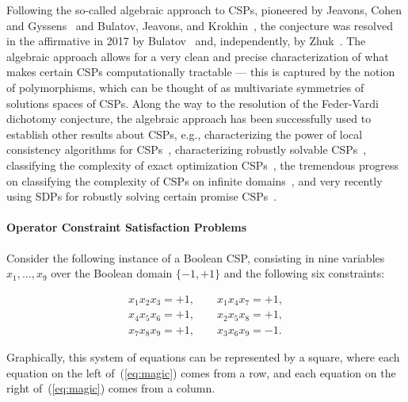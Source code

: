 \documentclass[11pt,letter]{article}
\begin{document}
Following the so-called algebraic approach to CSPs, pioneered by Jeavons, Cohen
and Gyssens~\cite{Jeavons97:closure} and Bulatov, Jeavons, and
Krokhin~\cite{Bulatov05:classifying}, the conjecture was resolved in the
affirmative in 2017 by Bulatov~\cite{Bulatov17:focs} and, independently,
by Zhuk~\cite{Zhuk17:focs,Zhuk20:jacm}. The algebraic approach allows for a very clean and
precise characterization of what makes certain CSPs computationally tractable
--- this is captured by the notion of polymorphisms, which can be thought of as
multivariate symmetries of solutions spaces of CSPs.
Along the way to the resolution of the Feder-Vardi dichotomy conjecture, the
algebraic approach has been successfully used to
establish other results about CSPs, 
e.g., characterizing the power of local consistency
algorithms for CSPs~\cite{Bulatov09:width,Barto14:local}, characterizing robustly solvable
CSPs~\cite{Guruswami12:tght,Dalmau13:toct,Barto16:sicomp}, classifying the
complexity of exact optimization CSPs~\cite{tz16:jacm,Kolmogorov17:sicomp}, the
tremendous progress on classifying the complexity of CSPs on infinite
domains~\cite{Bodirsky2021complexity}, and very recently using SDPs for robustly
solving certain promise CSPs~\cite{BGS23:stoc}.

\paragraph{Operator Constraint Satisfaction Problems}

Consider the following instance of a Boolean CSP, consisting in nine variables $x_1,\ldots,x_9$ over the Boolean domain $\{-1,+1\}$ and the following six
constraints:

\begin{equation}\label{eq:magic}
  \begin{split}
    x_1 x_2 x_3 = +1, \qquad x_1 x_4 x_7 = +1,\\
    x_4 x_5 x_6 = +1, \qquad x_2 x_5 x_8 = +1,\\
    x_7 x_8 x_9 = +1, \qquad x_3 x_6 x_9 = -1.
  \end{split}
\end{equation}

Graphically, this system of equations can be represented by a square, where each
equation on the left of~(\ref{eq:magic}) comes from a row, and each equation on the right
of~(\ref{eq:magic}) comes from a column.
\end{document}
